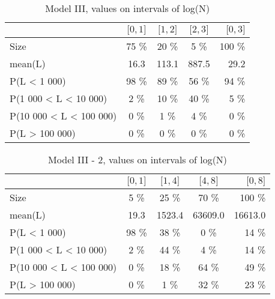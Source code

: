 \documentclass[numbered]{CSL}
\begin{document}
\setlength{\tabcolsep}{0.5em}
\begin{table}
\centering
\caption{Model III, values on intervals of log(N) \label{table:NModelIII}}
\begin{tabular}{l|ccc|r}
\toprule
{} & \small{$\lbrack 0, 1 \rbrack$} & \small{$\lbrack 1, 2 \rbrack$} & \small{$\lbrack 2, 3 \rbrack$} & \small{$\lbrack 0, 3 \rbrack$} \\
\midrule
Size                    &               75 \% &               20 \% &                5 \% &              100 \% \\
mean(L)                 &               16.3 &              113.1 &              887.5 &               29.2 \\
P(L < 1 000)            &               98 \% &               89 \% &               56 \% &               94 \% \\
P(1 000 < L < 10 000)   &                2 \% &               10 \% &               40 \% &                5 \% \\
P(10 000 < L < 100 000) &                0 \% &                1 \% &                4 \% &                0 \% \\
P(L > 100 000)          &                0 \% &                0 \% &                0 \% &                0 \% \\
\bottomrule
\end{tabular}
\end{table}

\setlength{\tabcolsep}{0.5em}
\begin{table}
\centering
\caption{Model III - 2, values on intervals of log(N) \label{table:NModelIII-2}}
\begin{tabular}{l|ccc|r}
\toprule
{} & \small{$\lbrack 0, 1 \rbrack$} & \small{$\lbrack 1, 4 \rbrack$} & \small{$\lbrack 4, 8 \rbrack$} & \small{$\lbrack 0, 8 \rbrack$} \\
\midrule
Size                    &                5 \% &               25 \% &               70 \% &              100 \% \\
mean(L)                 &               19.3 &             1523.4 &            63609.0 &            16613.0 \\
P(L < 1 000)            &               98 \% &               38 \% &                0 \% &               14 \% \\
P(1 000 < L < 10 000)   &                2 \% &               44 \% &                4 \% &               14 \% \\
P(10 000 < L < 100 000) &                0 \% &               18 \% &               64 \% &               49 \% \\
P(L > 100 000)          &                0 \% &                1 \% &               32 \% &               23 \% \\
\bottomrule
\end{tabular}
\end{table}
\end{document}
